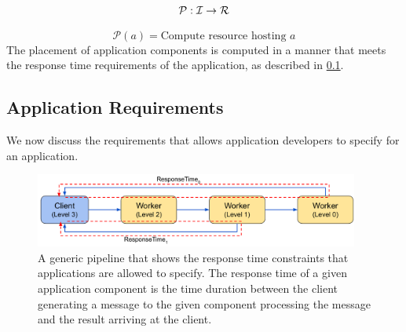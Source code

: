 \begin{equation}
\label{eq:placement_domain_eqn}
\mathcal{P} : \mathcal{I} \rightarrow \mathcal{R}
\end{equation}

\begin{equation}
\label{eq:placement_eqn}
\mathcal{P} \left( a \right) = \text{Compute resource hosting }a
\end{equation}
The placement of application components is computed in a manner that meets the response time requirements of the application, as described in \cref{sec:oneedge_app_reqs}.

\subsection{Application Requirements}
\label{sec:oneedge_app_reqs}
We now discuss the requirements that \oneedge{} allows application developers to specify for an application.
\begin{figure}
	\centering
	\includegraphics[width=0.95\textwidth]{figures/oneedge/app_pipeline_slo.pdf}
    \caption{
    A generic pipeline that shows the response time constraints that applications are allowed to specify. The response time of a given application component is the time duration between the client generating a message to the given component processing the message and the result arriving at the client.}
	\label{fig:pipeline_lat}
\end{figure}

